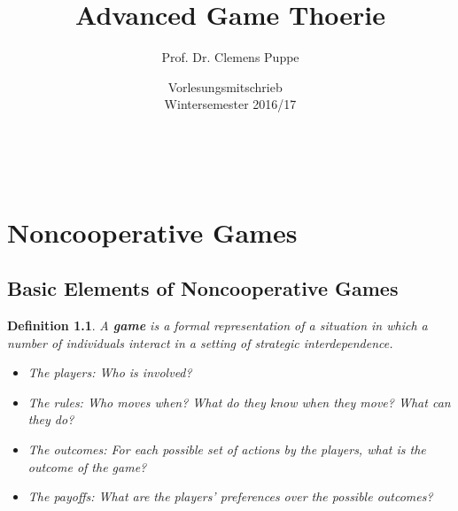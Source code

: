 \documentclass[12pt]{extreport} %
\title{Advanced Game Thoerie}
\author{Prof. Dr. Clemens Puppe}
\date{Vorlesungsmitschrieb ~\vspace{0.2cm} \\ Wintersemester 2016/17}
\makeatletter
\theoremstyle{named}
\theoremstyle{itshape}
\newtheorem*{definition}{Definition}
\theoremstyle{normal}
\def\maketitle{ \begin{titlepage} 
			~\vspace{3cm} 
		\begin{center} {\Huge \@title} \end{center} 
	 		\vspace*{1cm} 
	 	\begin{center} {\large \@author} \end{center} 
	 	\begin{center} \@date \end{center} 
	 		\vspace*{7cm} 
	 	\begin{center} \@publishers \end{center} 
	 		\vfill 
	\end{titlepage} }
\makeatother
\begin{document}
\begin{titlepage}
	\maketitle
	\thispagestyle{empty}
\end{titlepage}
	
\tableofcontents
\thispagestyle{empty} 
  
\chapter{Noncooperative Games}

\section{Basic Elements of Noncooperative Games}


\begin{definition}
	A \textbf{game} is a formal representation of a situation in which a number of individuals interact in a setting of strategic interdependence.
	
	\begin{itemize}
		\item The players: Who is involved?
		\item The rules: Who moves when? What do they know when they move? What can they do?
		\item The outcomes: For each possible set of actions by the players, what is the outcome of the game?
		\item The payoffs: What are the players' preferences over the possible outcomes?
	\end{itemize} 
\end{definition} ~\newpage
\end{document}
